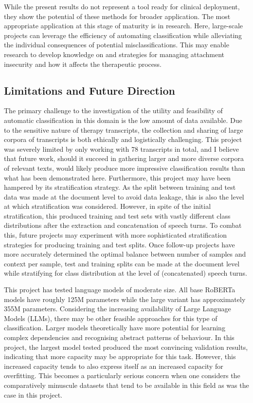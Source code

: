 \documentclass[12pt]{report}
\begin{document}
While the present results do not represent a tool ready for clinical deployment, they show the potential of these methods for broader application.
The most appropriate application at this stage of maturity is in research.
Here, large-scale projects can leverage the efficiency of automating classification while alleviating the individual consequences of potential misclassifications.
This may enable research to develop knowledge on and strategies for managing attachment insecurity and how it affects the therapeutic process.

\subsection{Limitations and Future Direction}
The primary challenge to the investigation of the utility and feasibility of automatic classification in this domain is the low amount of data available.
Due to the sensitive nature of therapy transcripts, the collection and sharing of large corpora of transcripts is both ethically and logistically challenging.
This project was severely limited by only working with 78 transcripts in total, and I believe that future work, should it succeed in gathering larger and more diverse corpora of relevant texts, would likely produce more impressive classification results than what has been demonstrated here.
Furthermore, this project may have been hampered by its stratification strategy.
As the split between training and test data was made at the document level to avoid data leakage, this is also the level at which stratification was considered.
However, in spite of the initial stratification, this produced training and test sets with vastly different class distributions after the extraction and concatenation of speech turns.
To combat this, future projects may experiment with more sophisticated stratification strategies for producing training and test splits.
Once follow-up projects have more accurately determined the optimal balance between number of samples and context per sample, test and training splits can be made at the document level while stratifying for class distribution at the level of (concatenated) speech turns.

This project has tested language models of moderate size. All base RoBERTa models have roughly 125M parameters while the large variant has approximately 355M parameters.
Considering the increasing availability of Large Language Models (LLMs), there may be other feasible approaches for this type of classification.
Larger models theoretically have more potential for learning complex dependencies and recognising abstract patterns of behaviour.
In this project, the largest model tested produced the most convincing validation results, indicating that more capacity may be appropriate for this task.
However, this increased capacity tends to also express itself as an increased capacity for overfitting.
This becomes a particularly serious concern when one considers the comparatively minuscule datasets that tend to be available in this field as was the case in this project.
\end{document}
